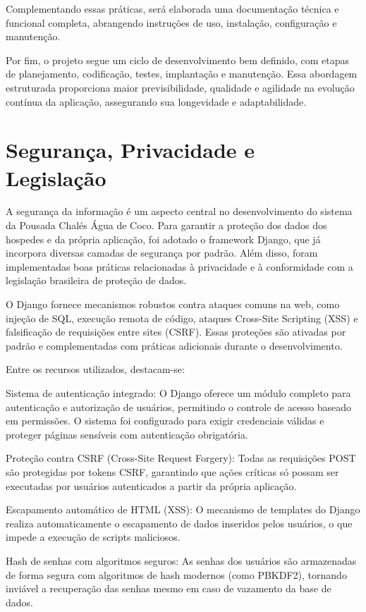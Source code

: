 \documentclass[
	12pt,				%
	openany,			%
	twoside,			%
	a4paper,			%
	english,			%
	french,				%
	spanish,			%
	brazil				%
	]{abntex2}
\begin{document}
Complementando essas práticas, será elaborada uma documentação técnica e funcional completa, abrangendo instruções de uso, instalação, configuração e manutenção.

Por fim, o projeto segue um ciclo de desenvolvimento bem definido, com etapas de planejamento, codificação, testes, implantação e manutenção. Essa abordagem estruturada proporciona maior previsibilidade, qualidade e agilidade na evolução contínua da aplicação, assegurando sua longevidade e adaptabilidade.

\section{Segurança, Privacidade e Legislação}
A segurança da informação é um aspecto central no desenvolvimento do sistema da Pousada Chalés Água de Coco. Para garantir a proteção dos dados dos hospedes e da própria aplicação, foi adotado o framework Django, que já incorpora diversas camadas de segurança por padrão. Além disso, foram implementadas boas práticas relacionadas à privacidade e à conformidade com a legislação brasileira de proteção de dados.

O Django fornece mecanismos robustos contra ataques comuns na web, como injeção de SQL, execução remota de código, ataques Cross-Site Scripting (XSS) e falsificação de requisições entre sites (CSRF). Essas proteções são ativadas por padrão e complementadas com práticas adicionais durante o desenvolvimento.

Entre os recursos utilizados, destacam-se:

Sistema de autenticação integrado: O Django oferece um módulo completo para autenticação e autorização de usuários, permitindo o controle de acesso baseado em permissões. O sistema foi configurado para exigir credenciais válidas e proteger páginas sensíveis com autenticação obrigatória.

Proteção contra CSRF (Cross-Site Request Forgery): Todas as requisições POST são protegidas por tokens CSRF, garantindo que ações críticas só possam ser executadas por usuários autenticados a partir da própria aplicação.

Escapamento automático de HTML (XSS): O mecanismo de templates do Django realiza automaticamente o escapamento de dados inseridos pelos usuários, o que impede a execução de scripts maliciosos.

Hash de senhas com algoritmos seguros: As senhas dos usuários são armazenadas de forma segura com algoritmos de hash modernos (como PBKDF2), tornando inviável a recuperação das senhas mesmo em caso de vazamento da base de dados.
\end{document}
